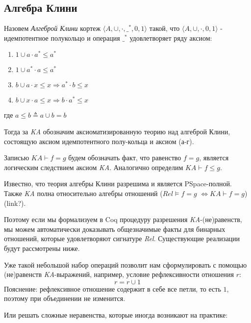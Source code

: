 \documentclass[times
              ]{itmo-student-thesis}
\begin{document}
    \subsection{Алгебра Клини}
      Назовем \textit{Алгеброй Клини} кортеж $\langle A,\cup,\cdot,\_^*,0,1\rangle$ такой, что $\langle A, \cup, \cdot, 0, 1 \rangle$ - идемпотентное полукольцо и операция $ \_^* $ удовлетворяет ряду аксиом:
      \begin{enumerate}
        \item $ 1 \cup a \cdot a^* \leq a^* $
        \item $ 1 \cup a^* \cdot a \leq a^* $
        \item $ b \cup a \cdot x \leq x \Rightarrow a^* \cdot b \leq x $
        \item $ b \cup x \cdot a \leq x \Rightarrow b \cdot a^* \leq x $
      \end{enumerate}
      где  $ a \leq b \triangleq a \cup b = b$

      Тогда за \textit{KA} обозначим аксиоматизированную теорию над алгеброй Клини, состоящую аксиом
      идемпотентного полу-кольца и аксиом (а-г).

      Записью $ \mathit{KA} \vdash f = g $ будем обозначать факт, что равенство $ f = g $, является
      логическим следствием аксиом \textit{KA}.
      Аналогично определим $ \mathit{KA} \vdash f \leq g $.

      Известно, что теория алгебры Клини разрешима и является PSpace-полной\cite{word_problem_pspace}.
      Также \textit{KA} полна относительно алгебры отношений
      ($ \mathit{Rel} \models f = g $ $ \Leftrightarrow \mathit{KA} \vdash f = g$) (link?).

      Поэтому если мы формализуем в Coq процедуру разрешения \textit{KA}-(не)равенств, мы можем
      автоматически доказывать общезначимые факты для бинарных отношений, которые удовлетворяют
      сигнатуре \textit{Rel}.
      Существующие реализации будут рассмотрены ниже.

      Уже такой небольшой набор операций позволит нам сформулировать с помощью (не)равенств
      \textit{KA}-выражений, например, условие рефлексивности отношения $ r $:
      $$ r = r \cup 1 $$
      Пояснение: рефлексивное отношение содержит в себе все петли, то есть $ 1 $, поэтому при
      объединении не изменится.

      Или решать сложные неравенства, которые иногда возникают на практике:
\end{document}
